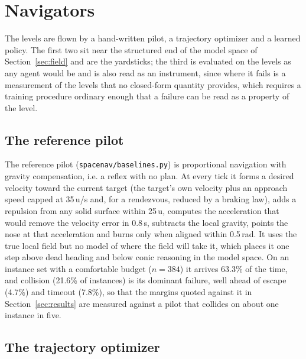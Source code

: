 \documentclass[11pt]{article}
\newcommand{\code}[1]{\texttt{\small #1}}
\begin{document}
\section{Navigators}
\label{sec:navigators}

The levels are flown by a hand-written pilot, a trajectory optimizer and a
learned policy. The first two sit near the structured end of the model
space of Section~\ref{sec:field} and are the yardsticks; the third is
evaluated on the levels as any agent would be and is also read as an
instrument, since where it fails is a measurement of the levels that no
closed-form quantity provides, which requires a training procedure ordinary
enough that a failure can be read as a property of the level.

\subsection{The reference pilot}
\label{sec:pilot}

The reference pilot (\code{spacenav/baselines.py}) is proportional
navigation with gravity compensation, i.e. a reflex with no plan. At every
tick it forms a desired velocity toward the current target (the target's
own velocity plus an approach speed capped at 35\,u/s and, for a
rendezvous, reduced by a braking law), adds a repulsion from any solid
surface within 25\,u, computes the acceleration that would remove the
velocity error in 0.8\,s, subtracts the local gravity, points the nose at
that acceleration and burns only when aligned within 0.5\,rad. It uses the
true local field but no model of where the field will take it, which places
it one step above dead heading and below conic reasoning in the model
space. On an instance set with a comfortable budget ($n = 384$) it arrives
63.3\% of the time, and collision (21.6\% of instances) is its dominant
failure, well ahead of escape (4.7\%) and timeout (7.8\%), so that the
margins quoted against it in Section~\ref{sec:results} are measured
against a pilot that collides on about one instance in five.

\subsection{The trajectory optimizer}
\label{sec:optimizer}
\end{document}
